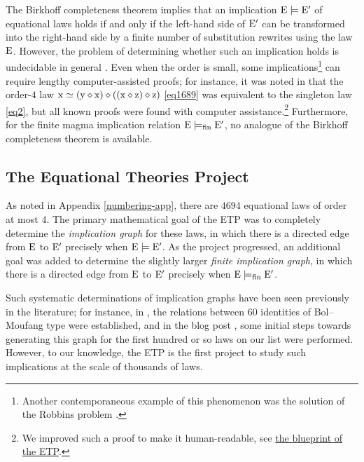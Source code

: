 The Birkhoff completeness theorem \cite[Th.~3.5.14]{term-rewriting} implies that an implication ${\mathrm{E}} \models {\mathrm{E}'}$ of equational laws holds if and only if the left-hand side of ${\mathrm{E}'}$ can be transformed into the right-hand side by a finite number of substitution rewrites using the law $\mathrm{E}$. However, the problem of determining whether such an implication holds is undecidable in general \cite{mckenzie}. Even when the order is small, some implications\footnote{Another contemporaneous example of this phenomenon was the solution of the Robbins problem \cite{robbins}.} can require lengthy computer-assisted proofs; for instance, it was noted in \cite{Kisielewicz2} that the order-$4$ law $\mathrm{x} \simeq (\mathrm{y} \diamond \mathrm{x}) \diamond ((\mathrm{x} \diamond \mathrm{z}) \diamond \mathrm{z})$ \eqref{eq1689} was equivalent to the singleton law \eqref{eq2}, but all known proofs were found with computer assistance.\footnote{We improved such a proof to make it human-readable, see \href{https://teorth.github.io/equational_theories/blueprint/implications-chapter.html}{the blueprint of the ETP}.}  Furthermore, for the finite magma implication relation ${\mathrm{E}} \models_{\mathrm{fin}} {\mathrm{E}'}$, no analogue of the Birkhoff completeness theorem is available.

\subsection{The Equational Theories Project}

As noted in Appendix \ref{numbering-app}, there are $\num{4694}$ equational laws of order at most $4$. The primary mathematical goal of the ETP was to completely determine the \emph{implication graph} for these laws, in which there is a directed edge from $\mathrm{E}$ to ${\mathrm{E}'}$ precisely when ${\mathrm{E}} \models {\mathrm{E}'}$. As the project progressed, an additional goal was added to determine the slightly larger \emph{finite implication graph}, in which there is a directed edge from $\mathrm{E}$ to ${\mathrm{E}'}$ precisely when ${\mathrm{E}} \models_{\mathrm{fin}} {\mathrm{E}'}$.

Such systematic determinations of implication graphs have been seen previously in the literature; for instance, in \cite{phillips-vojtechovsky}, the relations between $60$ identities of Bol--Moufang type were established, and in the blog post \cite[\S 17]{Wolfram_2022}, some initial steps towards generating this graph for the first hundred or so laws on our list were performed. However, to our knowledge, the ETP is the first project to study such implications at the scale of thousands of laws.

